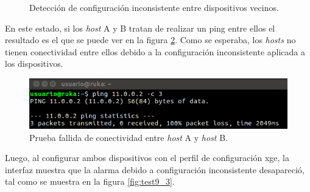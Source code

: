       \begin{figure}[H]
        \centering
        \caption{Detección de configuración inconsistente entre dispositivos vecinos.}
        \label{fig:test9_1}
      \end{figure}

      En este estado, si los \textit{host} A y B tratan de realizar un ping entre ellos el resultado es el que se puede ver en la figura \ref{fig:test9_2}. Como se esperaba, los \textit{hosts} no tienen conectividad entre ellos debido a la configuración inconsistente aplicada a los dispositivos.

      \begin{figure}[H]
        \centering
        \includegraphics[scale=0.7]{Figures/test9_2.png}
        \caption{Prueba fallida de conectividad entre \textit{host} A y \textit{host} B.}
        \label{fig:test9_2}
      \end{figure}

      Luego, al configurar ambos dispositivos con el perfil de configuración xge, la interfaz muestra que la alarma debido a configuración inconsistente desapareció, tal como se muestra en la figura \ref{fig:test9_3}.


